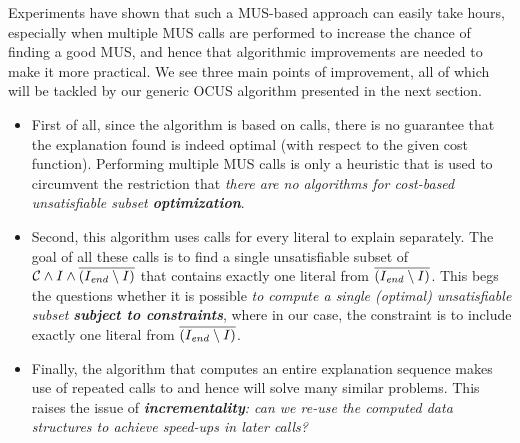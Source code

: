 Experiments have shown that such a MUS-based approach can easily take hours, especially when multiple MUS calls are performed to increase the chance of finding a good MUS, and hence that algorithmic improvements are needed to make it more practical. 
We see three main points of improvement, all of which will be tackled by our generic OCUS algorithm presented in the next section. 
\begin{itemize}
 \item First of all, since the algorithm is based on  calls, there is no guarantee that the explanation found is indeed optimal %
 (with respect to the given cost function). 
 Performing multiple MUS calls is only a heuristic that is used to circumvent the restriction that \textit{there are no algorithms for cost-based unsatisfiable subset \textbf{optimization}}. 
 \item Second, this algorithm uses  calls for every literal to explain separately. The goal of all these calls is to find a single unsatisfiable subset of $\mathcal{C}  \land I \land \overline{(I_\mathit{end} \setminus I)}$ that contains exactly one literal from $\overline{(I_\mathit{end} \setminus I)}$. This begs the questions whether it is possible \textit{to compute a single (optimal) unsatisfiable subset \textbf{subject to constraints}}, where in our case, the constraint is to include exactly one literal from $\overline{(I_\mathit{end} \setminus I)}$. 
 \item Finally, the algorithm that computes an entire explanation sequence makes use of repeated calls to \onestep and hence will solve many similar problems. This raises the issue of \textit{\textbf{incrementality}: can we re-use the computed data structures to achieve speed-ups in later calls?}
\end{itemize}




